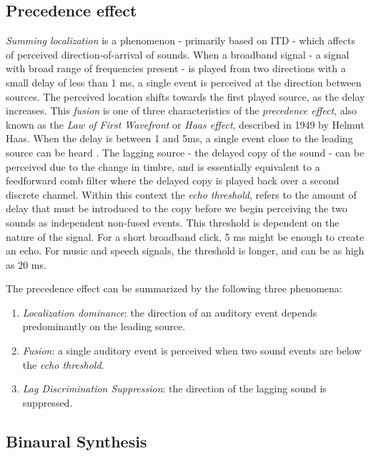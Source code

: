 \subsection{Precedence effect}

\textit{Summing localization} is a phenomenon - primarily based on ITD - which affects of perceived direction-of-arrival of sounds. When a broadband signal - a signal with broad range of frequencies present - is played from two directions with a small delay of less than 1 ms, a single event is perceived at the direction between sources. The perceived location shifts towards the first played source, as the delay increases. This \textit{fusion} is one of three characteristics of the \textit{precedence effect}, also known as the \textit{Law of First Wavefront} or \textit{Haas effect}, described in 1949 by Helmut Haas. When the delay is between 1 and 5ms, a single event close to the leading source can be heard \cite{hacihabiboglu2017perceptual}. The lagging source - the delayed copy of the sound - can be perceived due to the change in timbre, and is essentially equivalent to a feedforward comb filter where the delayed copy is played back over a second discrete channel. Within this context the \textit{echo threshold}, refers to the amount of delay that must be introduced to the copy before we begin perceiving the two sounds as independent non-fused events. This threshold is dependent on the nature of the signal. For a short broadband click, 5 ms might be enough to create an echo. For music and speech signals, the threshold is longer, and can be as high as 20 ms.

The precedence effect can be summarized by the following three phenomena: 

\begin{enumerate}
    \item \textit{Localization dominance}: the direction of an auditory event depends predominantly on the leading source.
    \item \textit{Fusion}: a single auditory event is perceived when two sound events are below the \textit{echo threshold}.
    \item \textit{Lag Discrimination Suppression}: the direction of the lagging sound is suppressed.  
\end{enumerate}

\subsection{Binaural Synthesis}

